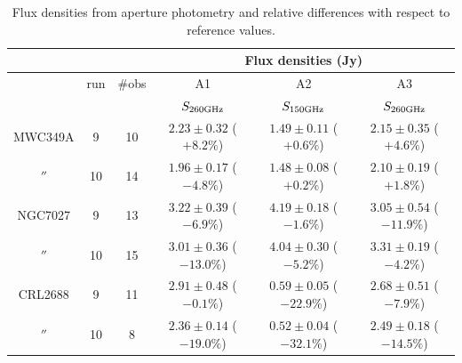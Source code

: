 \begin{table}[th]
\begin{center}
\begin{tabular}{|c|c|c|c|c|c|}
\hline
\multicolumn{3}{|c}{}  & \multicolumn{3}{|c|}{Flux densities (Jy)}   \\
\hline
         & run  & \#obs &  A1                    &  A2                   &    A3                    \\
         &      &      &  $S_{260 {\rm GHz}}$     &  $S_{150 {\rm GHz}}$  & $S_{260 {\rm GHz}}$    \\
\hline\hline
MWC349A   &  9   & 10  &  $2.23\pm0.32$  ($+8.2\%$)  &  $1.49\pm0.11$ ($+0.6\%$) &  $2.15\pm0.35$ ($+4.6\%$)      \\
  $''$   & 10   & 14  &  $1.96\pm0.17$  ($-4.8\%$)  &  $1.48\pm0.08$ ($+0.2\%$) &  $2.10\pm0.19$ ($+1.8\%$)                  \\ 
  \hline
NGC7027  &  9   & 13  &  $3.22\pm0.39$  ($-6.9\%$)  &  $4.19\pm0.18$ ($-1.6\%$) & $3.05\pm0.54$  ($-11.9\%$)      \\
  $''$   & 10   & 15  &  $3.01\pm0.36$  ($-13.0\%$) &  $4.04\pm0.30$ ($-5.2\%$) & $3.31\pm0.19$  ($-4.2\%$)                   \\ 
  \hline
CRL2688  &  9   & 11  &  $2.91\pm0.48$  ($-0.1\%$)  &  $0.59\pm0.05$ ($-22.9\%$)  &  $2.68\pm0.51$ ($-7.9\%$)     \\
  $''$   & 10   &  8  &  $2.36\pm0.14$  ($-19.0\%$) &  $0.52\pm0.04$ ($-32.1\%$)  &  $2.49\pm0.18$ ($-14.5\%$)                   \\
\hline
\end{tabular}
\caption[Flux densities from aperture photometry]{Flux densities from aperture photometry and relative differences with respect to reference values.}
\label{tab:flux_sec_Ap}
\end{center}
\end{table}



